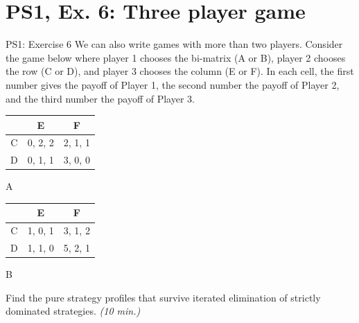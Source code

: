 \section{PS1, Ex. 6: Three player game}

\begin{frame}{PS1: Exercise 6}
  We can also write games with more than two players. Consider the game below where
  player 1 chooses the bi-matrix (A or B), player 2 chooses the row (C or D), and player 3
  chooses the column (E or F). In each cell, the first number gives the payoff of Player 1,
  the second number the payoff of Player 2, and the third number the payoff of Player 3.
\begin{multicols}{2}
\begin{table}
  \begin{tabular}{c|c|c}
      & E       & F       \\
    \midrule
    C & 0, 2, 2 & 2, 1, 1 \\
    \midrule
    D & 0, 1, 1 & 3, 0, 0
  \end{tabular}
  \center A
\end{table}
\vfill\null \columnbreak
\begin{table}
  \begin{tabular}{c|c|c}
      & E       & F       \\
    \midrule
    C & 1, 0, 1 & 3, 1, 2 \\
    \midrule
    D & 1, 1, 0 & 5, 2, 1
  \end{tabular}
  \center B
\end{table}
\vfill\null
\end{multicols}
Find the pure strategy profiles that survive iterated elimination of strictly dominated strategies. \textit{(10 min.)}
\end{frame}

